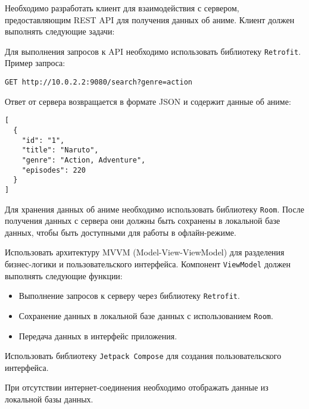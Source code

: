 
Необходимо разработать клиент для взаимодействия с сервером, предоставляющим REST API для получения данных об аниме. Клиент должен выполнять следующие задачи:


Для выполнения запросов к API необходимо использовать библиотеку \texttt{Retrofit}. Пример запроса:

\begin{verbatim}
GET http://10.0.2.2:9080/search?genre=action
\end{verbatim}

Ответ от сервера возвращается в формате JSON и содержит данные об аниме:

\begin{verbatim}
[
  {
    "id": "1",
    "title": "Naruto",
    "genre": "Action, Adventure",
    "episodes": 220
  }
]
\end{verbatim}

Для хранения данных об аниме необходимо использовать библиотеку \texttt{Room}. После получения данных с сервера они должны быть сохранены в локальной базе данных, чтобы быть доступными для работы в офлайн-режиме.

Использовать архитектуру MVVM (Model-View-ViewModel) для разделения бизнес-логики и пользовательского интерфейса. Компонент \texttt{ViewModel} должен выполнять следующие функции:
\begin{itemize}
    \item Выполнение запросов к серверу через библиотеку \texttt{Retrofit}.
    \item Сохранение данных в локальной базе данных с использованием \texttt{Room}.
    \item Передача данных в интерфейс приложения.
\end{itemize}

Использовать библиотеку \texttt{Jetpack Compose} для создания пользовательского интерфейса.

При отсутствии интернет-соединения необходимо отображать данные из локальной базы данных.
